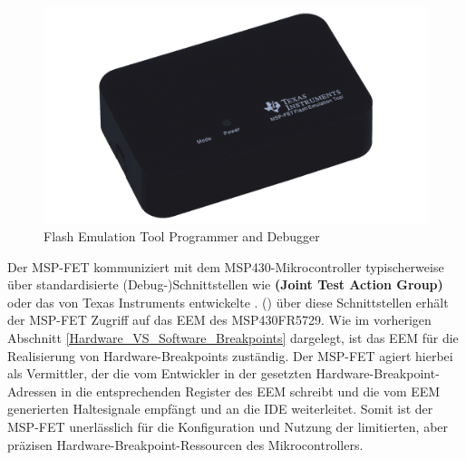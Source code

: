 \begin{figure}[h!]
	\centering
	\includegraphics[width=1.0\textwidth]{../Bilder/msp_fet.png}
	\caption{Flash Emulation Tool Programmer and Debugger }
	\label{fig:msp_fet}
\end{figure}

Der MSP-FET kommuniziert mit dem MSP430-Mikrocontroller typischerweise \"uber standardisierte (Debug-)Schnittstellen wie \textbf{ (Joint Test Action Group)} oder das von Texas Instruments entwickelte . () \"uber diese Schnittstellen erh\"alt der MSP-FET Zugriff auf das EEM des MSP430FR5729. Wie im vorherigen Abschnitt \ref{Hardware_VS_Software_Breakpoints} dargelegt, ist das EEM f\"ur die Realisierung von Hardware-Breakpoints zust\"andig. Der MSP-FET agiert hierbei als Vermittler, der die vom Entwickler in der  gesetzten Hardware-Breakpoint-Adressen in die entsprechenden Register des EEM schreibt und die vom EEM generierten Haltesignale empf\"angt und an die IDE weiterleitet. Somit ist der MSP-FET unerl\"asslich f\"ur die Konfiguration und Nutzung der limitierten, aber pr\"azisen Hardware-Breakpoint-Ressourcen des Mikrocontrollers. 

